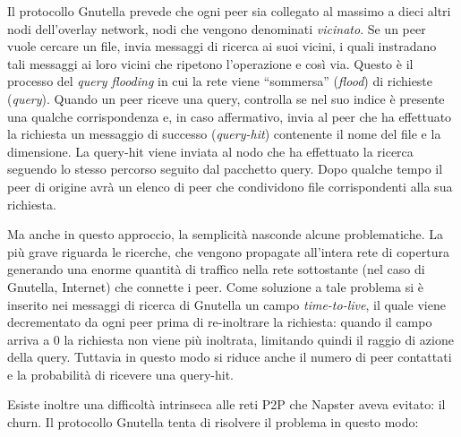 Il protocollo Gnutella prevede che ogni peer sia collegato al massimo a dieci altri nodi dell'overlay network, nodi che vengono denominati \emph{vicinato}. Se un peer vuole cercare un file, invia messaggi di ricerca ai suoi vicini, i quali instradano tali messaggi ai loro vicini che ripetono l'operazione e così via. Questo è il processo del \emph{query flooding} in cui la rete viene ``sommersa'' (\emph{flood}) di richieste (\emph{query}). Quando un peer riceve una query, controlla se nel suo indice è presente una qualche corrispondenza e, in caso affermativo, invia al peer che ha effettuato la richiesta un messaggio di successo (\emph{query-hit}) contenente il nome del file e la dimensione. La query-hit viene inviata al nodo che ha effettuato la ricerca seguendo lo stesso percorso seguito dal pacchetto query. Dopo qualche tempo il peer di origine avrà un elenco di peer che condividono file corrispondenti alla sua richiesta.

Ma anche in questo approccio, la semplicità nasconde alcune problematiche. La più grave riguarda le ricerche, che vengono propagate all'intera rete di copertura generando una enorme quantità di traffico nella rete sottostante (nel caso di Gnutella, Internet) che connette i peer. Come soluzione a tale problema si è inserito nei messaggi di ricerca di Gnutella un campo \emph{time-to-live}, il quale viene decrementato da ogni peer prima di re-inoltrare la richiesta: quando il campo arriva a 0 la richiesta non viene più inoltrata, limitando quindi il raggio di azione della query. Tuttavia in questo modo si riduce anche il numero di peer contattati e la probabilità di ricevere una query-hit.

Esiste inoltre una difficoltà intrinseca alle reti P2P che Napster aveva evitato: il \gls{churn}. Il protocollo Gnutella tenta di risolvere il problema in questo modo:

